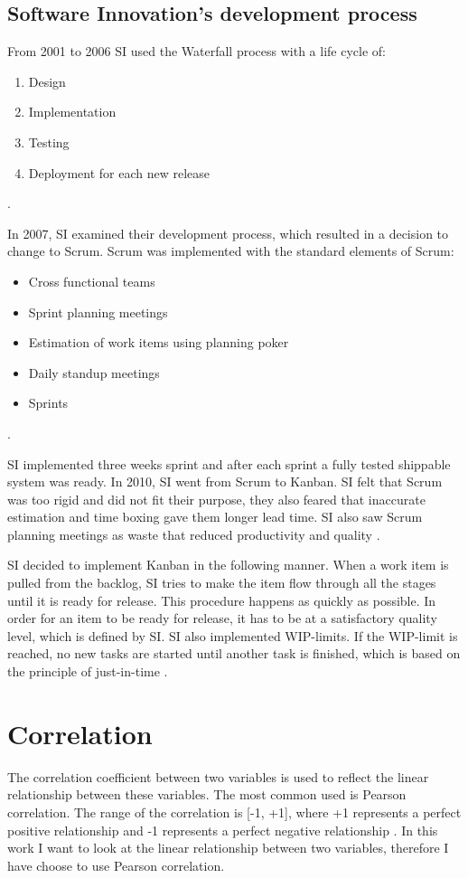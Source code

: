 \documentclass[UKenglish]{ifimaster}  %
\begin{document}
\subsection{Software Innovation's development process}
From 2001 to 2006 SI used the Waterfall process with a life cycle of:
\begin{enumerate}[noitemsep,topsep=0pt,parsep=0pt,partopsep=0pt]
\item Design
\item Implementation 
\item Testing
\item Deployment for each new release
\end{enumerate} 
\parencite{Dag}. 

In 2007, SI examined their development process, which resulted in a decision to change to Scrum. Scrum was implemented with the standard elements of Scrum:
\begin{itemize}[noitemsep,topsep=0pt,parsep=0pt,partopsep=0pt]
\item Cross functional teams
\item Sprint planning meetings 
\item Estimation of work items using planning poker
\item Daily standup meetings
\item Sprints
\end{itemize}
\parencite{Dag}. 

SI implemented three weeks sprint and after each sprint a fully tested shippable system was ready. In 2010, SI went from Scrum to Kanban. SI felt that Scrum was too rigid and did not fit their purpose, they also feared that inaccurate estimation and time boxing gave them longer lead time. SI also saw Scrum planning meetings as waste that reduced productivity and quality \parencite{Dag}. 

SI decided to implement Kanban in the following manner. When a work item is pulled from the backlog, SI tries to make the item flow through all the stages until it is ready for release. This procedure happens as quickly as possible. In order for an item to be ready for release, it has to be at a satisfactory quality level, which is defined by SI. SI also implemented WIP-limits. If the WIP-limit is reached, no new tasks are started until another task is finished, which is based on the principle of just-in-time \parencite{Dag}.

\section{Correlation}
The correlation coefficient between two variables is used to reflect the linear relationship between these variables. The most common used is Pearson correlation.  The range of the correlation is [-1, +1], where +1 represents a perfect positive relationship and -1 represents a perfect negative relationship \parencite{6683402}. In this work I want to look at the linear relationship between two variables, therefore I have choose to use Pearson correlation.
\end{document}
